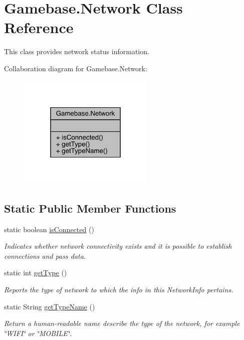 \hypertarget{classcom_1_1toast_1_1android_1_1gamebase_1_1_gamebase_1_1_network}{}\section{Gamebase.\+Network Class Reference}
\label{classcom_1_1toast_1_1android_1_1gamebase_1_1_gamebase_1_1_network}


This class provides network status information.  




Collaboration diagram for Gamebase.\+Network\+:
\nopagebreak
\begin{figure}[H]
\begin{center}
\leavevmode
\includegraphics[width=184pt]{classcom_1_1toast_1_1android_1_1gamebase_1_1_gamebase_1_1_network__coll__graph}
\end{center}
\end{figure}
\subsection*{Static Public Member Functions}
\begin{DoxyCompactItemize}
\item 
static boolean \hyperlink{classcom_1_1toast_1_1android_1_1gamebase_1_1_gamebase_1_1_network_a794a5c628defa296e0feccd47fcd1113}{is\+Connected} ()
\begin{DoxyCompactList}\small\item\em Indicates whether network connectivity exists and it is possible to establish connections and pass data. \end{DoxyCompactList}\item 
static int \hyperlink{classcom_1_1toast_1_1android_1_1gamebase_1_1_gamebase_1_1_network_a266dfc4b57f7c115e6323b37841f9f83}{get\+Type} ()
\begin{DoxyCompactList}\small\item\em Reports the type of network to which the info in this Network\+Info pertains. \end{DoxyCompactList}\item 
static String \hyperlink{classcom_1_1toast_1_1android_1_1gamebase_1_1_gamebase_1_1_network_afc9b9c5fd3623a1bc4efb56deab90dbf}{get\+Type\+Name} ()
\begin{DoxyCompactList}\small\item\em Return a human-\/readable name describe the type of the network, for example \char`\"{}\+W\+I\+F\+I\char`\"{} or \char`\"{}\+M\+O\+B\+I\+L\+E\char`\"{}. \end{DoxyCompactList}\end{DoxyCompactItemize}


